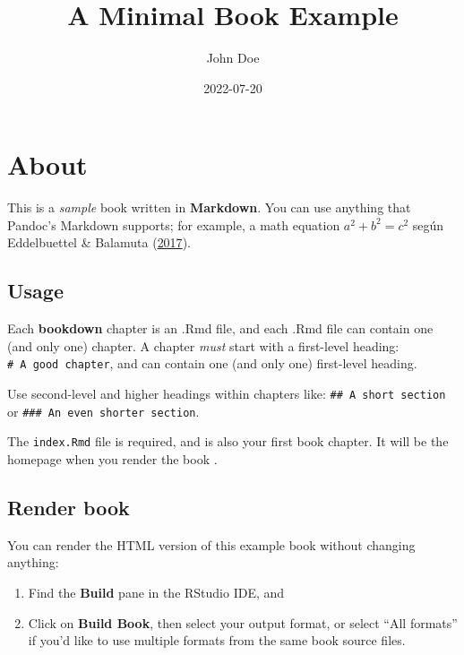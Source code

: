 \documentclass[
  12pt,
]{book}
\title{A Minimal Book Example}
\author{John Doe}
\date{2022-07-20}
\theoremstyle{definition}
\theoremstyle{definition}
\theoremstyle{definition}
\theoremstyle{definition}
\theoremstyle{remark}
\begin{document}
\maketitle

{
\setcounter{tocdepth}{1}
\tableofcontents
}
\listoffigures
\listoftables
\mainmatter

\hypertarget{about}{%
\chapter{About}\label{about}}

This is a \emph{sample} book written in \textbf{Markdown}. You can use anything that Pandoc's Markdown supports; for example, a math equation \(a^2 + b^2 = c^2\) según Eddelbuettel \& Balamuta (\protect\hyperlink{ref-eddelbuettel2017ExtendingBrief}{2017}).

\hypertarget{usage}{%
\section{Usage}\label{usage}}

Each \textbf{bookdown} chapter is an .Rmd file, and each .Rmd file can contain one (and only one) chapter. A chapter \emph{must} start with a first-level heading: \texttt{\#\ A\ good\ chapter}, and can contain one (and only one) first-level heading.

Use second-level and higher headings within chapters like: \texttt{\#\#\ A\ short\ section} or \texttt{\#\#\#\ An\ even\ shorter\ section}.

The \texttt{index.Rmd} file is required, and is also your first book chapter. It will be the homepage when you render the book .

\hypertarget{render-book}{%
\section{Render book}\label{render-book}}

You can render the HTML version of this example book without changing anything:

\begin{enumerate}
\def\labelenumi{\arabic{enumi}.}
\item
  Find the \textbf{Build} pane in the RStudio IDE, and
\item
  Click on \textbf{Build Book}, then select your output format, or select ``All formats'' if you'd like to use multiple formats from the same book source files.
\end{enumerate}
\end{document}
